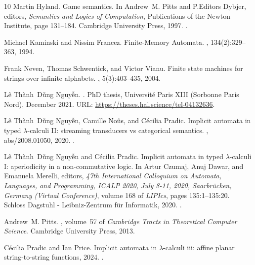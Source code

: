 \documentclass[10pt,a4paper]{amsart}
\numberwithin{equation}{section}
\theoremstyle{plain}
\begin{document}
\begin{thebibliography}{10}
Martin Hyland.
\newblock Game semantics.
\newblock In Andrew~M. Pitts and P.Editors Dybjer, editors, {\em Semantics and
  Logics of Computation}, Publications of the Newton Institute, page 131–184.
  Cambridge University Press, 1997.
\newblock \href {https://doi.org/10.1017/CBO9780511526619.005}
  {}.

Michael Kaminski and Nissim Francez.
\newblock Finite-{{Memory Automata}}.
, 134(2):329--363, 1994.

Frank Neven, Thomas Schwentick, and Victor Vianu.
\newblock Finite state machines for strings over infinite alphabets.
, 5(3):403--435, 2004.

Lê Thành~Dũng Nguy\~{\^e}n.
.
\newblock PhD thesis, Université Paris XIII (Sorbonne Paris Nord), December
  2021.
\newblock URL: \url{https://theses.hal.science/tel-04132636}.

Lê Thành~Dũng Nguy\~{\^e}n, Camille No{\^{u}}s, and Cécilia Pradic.
\newblock Implicit automata in typed {\(\lambda\)}-calculi {II:} streaming
  transducers vs categorical semantics.
, abs/2008.01050, 2020.
\newblock \href {https://arxiv.org/abs/2008.01050} {}.

Lê Thành~Dũng Nguy\~{\^e}n and Cécilia Pradic.
\newblock Implicit automata in typed $\lambda$-calculi {I}: aperiodicity in a
  non-commutative logic.
\newblock In Artur Czumaj, Anuj Dawar, and Emanuela Merelli, editors, {\em 47th
  International Colloquium on Automata, Languages, and Programming, {ICALP}
  2020, July 8-11, 2020, Saarbr{\"{u}}cken, Germany (Virtual Conference)},
  volume 168 of {\em LIPIcs}, pages 135:1--135:20. Schloss Dagstuhl -
  Leibniz-Zentrum für Informatik, 2020.
\newblock \href {https://doi.org/10.4230/LIPIcs.ICALP.2020.135}
  {}.

Andrew~M. Pitts.
, volume~57
  of {\em Cambridge Tracts in Theoretical Computer Science}.
\newblock Cambridge University Press, 2013.

Cécilia Pradic and Ian Price.
\newblock Implicit automata in $\lambda$-calculi iii: affine planar
  string-to-string functions, 2024.
\newblock \href {https://arxiv.org/abs/2404.03985} {}.


\end{thebibliography}
\end{document}
